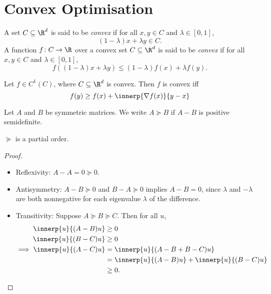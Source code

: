 \section{Convex Optimisation} \label{sec:convex}
\begin{definition} \label{def:convex}
    A set $C \subseteq \R^d$ is said to be \emph{convex} if for all
    $x, y \in C$ and $\lambda \in [0, 1]$, \[
        (1-\lambda)x + \lambda y \in C.
    \]
    A function $f\colon C \to \R$ over a convex set $C \subseteq \R^d$ is
    said to be \emph{convex} if for all $x, y \in C$ and
    $\lambda \in [0, 1]$, \[
        f((1-\lambda)x + \lambda y) \le (1-\lambda)f(x) + \lambda f(y).
    \]
\end{definition}

\begin{theorem}
    Let $f \in C^1(C)$, where $C \subseteq \R^d$ is convex.
    Then $f$ is convex iff \[
        f(y) \ge f(x) + \innerp{\nabla f(x)}{y-x}
    \]
\end{theorem}

\begin{notation}
    Let $A$ and $B$ be symmetric matrices.
    We write $A \succeq B$ if $A - B$ is positive semidefinite.
\end{notation}
\begin{theorem}
    $\succeq$ is a partial order.
\end{theorem}
\begin{proof} \leavevmode
    \begin{itemize}
        \item Reflexivity: $A - A = 0 \succeq 0$.
        \item Antisymmetry: $A - B \succeq 0$ and $B - A \succeq 0$ implies
            $A - B = 0$, since $\lambda$ and $-\lambda$ are both nonnegative
            for each eigenvalue $\lambda$ of the difference.
        \item Transitivity: Suppose $A \succeq B \succeq C$.
        Then for all $u$,
        \begin{align*}
            \innerp{u}{(A - B)u} &\ge 0 \\
            \innerp{u}{(B - C)u} &\ge 0 \\
            \implies \innerp{u}{(A - C)u} &= \innerp{u}{(A - B + B - C)u} \\
            &= \innerp{u}{(A - B)u} + \innerp{u}{(B - C)u} \\
            &\ge 0. \qedhere
        \end{align*}
    \end{itemize}
\end{proof}

